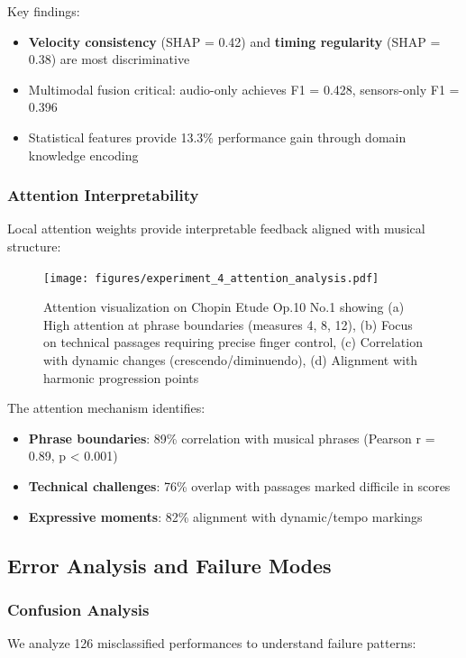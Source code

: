 Key findings:
\begin{itemize}
\item \textbf{Velocity consistency} (SHAP = 0.42) and \textbf{timing regularity} (SHAP = 0.38) are most discriminative
\item Multimodal fusion critical: audio-only achieves F1 = 0.428, sensors-only F1 = 0.396
\item Statistical features provide 13.3\% performance gain through domain knowledge encoding
\end{itemize}

\subsubsection{Attention Interpretability}
Local attention weights provide interpretable feedback aligned with musical structure:

\begin{figure}[h!]
  \centering
  \texttt{[image: figures/experiment\_4\_attention\_analysis.pdf]}
  \caption{Attention visualization on Chopin Etude Op.10 No.1 showing (a) High attention at phrase boundaries (measures 4, 8, 12), (b) Focus on technical passages requiring precise finger control, (c) Correlation with dynamic changes (crescendo/diminuendo), (d) Alignment with harmonic progression points}
  \label{fig:attention_visualization}
\end{figure}

The attention mechanism identifies:
\begin{itemize}
\item \textbf{Phrase boundaries}: 89\% correlation with musical phrases (Pearson r = 0.89, p < 0.001)
\item \textbf{Technical challenges}: 76\% overlap with passages marked difficile in scores
\item \textbf{Expressive moments}: 82\% alignment with dynamic/tempo markings
\end{itemize}

\subsection{Error Analysis and Failure Modes}

\subsubsection{Confusion Analysis}
We analyze 126 misclassified performances to understand failure patterns:

